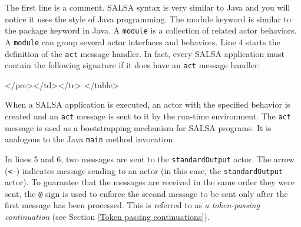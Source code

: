 The first line is a comment. SALSA syntax is very similar to Java and you will 
notice it uses the style of Java programming. 
The module keyword is similar to the package keyword in Java. A {\tt module} 
is a collection of related actor behaviors. A {\tt module} can group several 
actor interfaces and behaviors.
Line 4 starts the definition of the {\tt act} message handler. 
In fact, every 
SALSA application must contain the  
following signature if it does have an {\tt act} message handler:

{\singlespace

}
\begin{htmlonly}

 \begin{rawhtml} 
   </pre></td></tr>
  </table>
\end{rawhtml} 
\end{htmlonly}
 
When a SALSA application is executed, an actor with the specified behavior 
is created and an {\tt act} message is sent to it by the run-time environment. 
The {\tt act} message is used as a bootstrapping mechanism for SALSA programs. 
It is analogous to the Java {\tt main} method invocation.

In lines 5 and 6, two messages are sent to the {\tt standardOutput} actor.
The arrow ({\tt \textless-}) indicates message sending to an actor 
(in this case, the {\tt standardOutput} actor). To guarantee that the 
messages are received 
in the same order they were sent, the {\tt @} sign is used to enforce  
the second message to be sent only after the first message 
has been processed. This is referred to as \textit {a token-passing continuation}
(see Section \ref{Token passing continuations}). 

